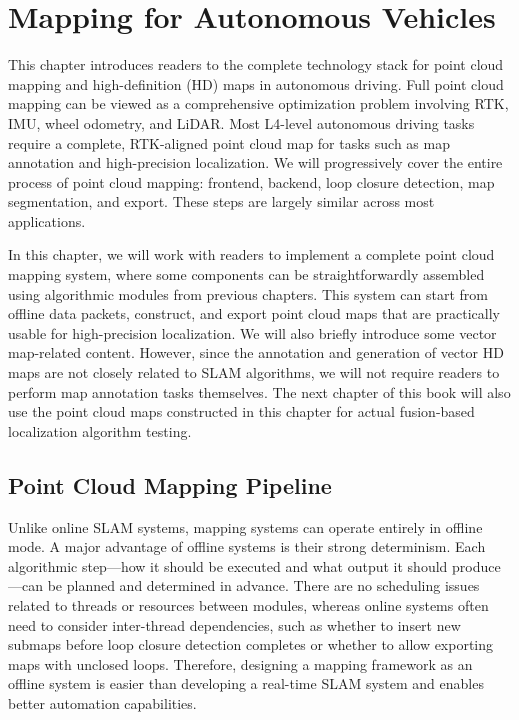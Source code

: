 \thispagestyle{empty}
\chapter{Mapping for Autonomous Vehicles}  
\thispagestyle{empty}  
\label{cpt:mapping}  

This chapter introduces readers to the complete technology stack for point cloud mapping and high-definition (HD) maps in autonomous driving. Full point cloud mapping can be viewed as a comprehensive optimization problem involving RTK, IMU, wheel odometry, and LiDAR. Most L4-level autonomous driving tasks require a complete, RTK-aligned point cloud map for tasks such as map annotation and high-precision localization. We will progressively cover the entire process of point cloud mapping: frontend, backend, loop closure detection, map segmentation, and export. These steps are largely similar across most applications.  

In this chapter, we will work with readers to implement a complete point cloud mapping system, where some components can be straightforwardly assembled using algorithmic modules from previous chapters. This system can start from offline data packets, construct, and export point cloud maps that are practically usable for high-precision localization. We will also briefly introduce some vector map-related content. However, since the annotation and generation of vector HD maps are not closely related to SLAM algorithms, we will not require readers to perform map annotation tasks themselves. The next chapter of this book will also use the point cloud maps constructed in this chapter for actual fusion-based localization algorithm testing.  



\section{Point Cloud Mapping Pipeline}  
Unlike online SLAM systems, mapping systems can operate entirely in offline mode. A major advantage of offline systems is their strong determinism. Each algorithmic step—how it should be executed and what output it should produce—can be planned and determined in advance. There are no scheduling issues related to threads or resources between modules, whereas online systems often need to consider inter-thread dependencies, such as whether to insert new submaps before loop closure detection completes or whether to allow exporting maps with unclosed loops. Therefore, designing a mapping framework as an offline system is easier than developing a real-time SLAM system and enables better automation capabilities.  

